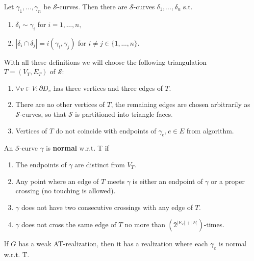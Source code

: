 \begin{fact}
	Let $\gamma_1, \dots, \gamma_n$ be $\mathcal{S}$-curves. Then there are $\mathcal{S}$-curves $\delta_1, \dots, \delta_n$ s.t.
	
	\begin{enumerate}
		\item $\delta_i \sim \gamma_i$ for $i = 1, \dots, n$,
		\item $|\delta_i \cap \delta_j| = i(\gamma_i, \gamma_j)$ for $i \neq j \in \{1, \dots, n\}$. 
	\end{enumerate}
\end{fact}

\noindent
With all these definitions we will choose the following triangulation $T = (V_T, E_T)$ of $\mathcal{S}$:

\begin{enumerate}
	\item $\forall v \in V: \partial D_v$ has three vertices and three edges of $T$.
	\item There are no other vertices of $T$, the remaining edges are chosen arbitrarily as $\mathcal{S}$-curves, so that $\mathcal{S}$ is partitioned into triangle faces.
	\item Vertices of $T$ do not coincide with endpoints of $\gamma_e, e \in E$ from algorithm.
\end{enumerate}

\begin{defn}
	An $\mathcal{S}$-curve $\gamma$ is \textbf{normal} w.r.t. T if
	
	\begin{enumerate}
		\item The endpoints of $\gamma$ are distinct from $V_T$.
		\item Any point where an edge of $T$ meets $\gamma$ is either an endpoint of $\gamma$ or a proper crossing (no touching is allowed).
		\item $\gamma$ does not have two consecutive crossings with any edge of $T$.
		\item $\gamma$ does not cross the same edge of $T$ no more than $(2^{|E_T| + |E|})$-times.
	\end{enumerate}
\end{defn}

\begin{claim}
	If $G$ has a weak AT-realization, then it has a realization where each $\gamma_e$ is normal w.r.t. T.
\end{claim}

